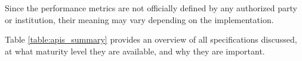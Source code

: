 Since the performance metrics are not officially defined by any authorized party or institution, their meaning may vary depending on the implementation.

Table \ref{table:apis_summary} provides an overview of all specifications discussed, at what maturity level they are available, and why they are important.





